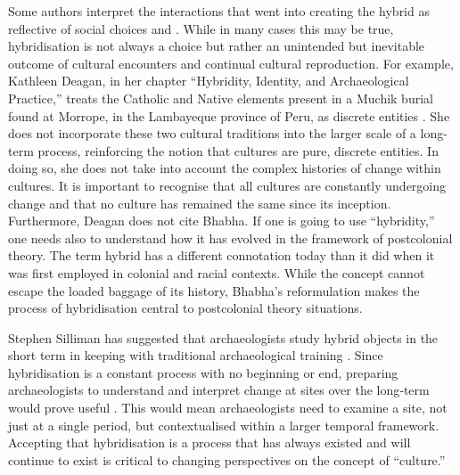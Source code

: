 	Some authors interpret the interactions that went into creating the hybrid as reflective of social choices \parencite {Deagan_2013} and \parencite {Silliman_2009}. While in many cases this may be true, hybridisation is not always a choice but rather an unintended but inevitable outcome of cultural encounters and continual cultural reproduction. For example, Kathleen Deagan, in her chapter “Hybridity, Identity, and Archaeological Practice,” treats the Catholic and Native elements present in a Muchik burial found at Morrope, in the Lambayeque province of Peru, as discrete entities \parencite[267] {Deagan_2013}. She does not incorporate these two cultural traditions into the larger scale of a long-term process, reinforcing the notion that cultures are pure, discrete entities. In doing so, she does not take into account the complex histories of change within cultures. It is important to recognise that all cultures are constantly undergoing change and that no culture has remained the same since its inception. Furthermore, Deagan does not cite Bhabha. If one is going to use “hybridity,” one needs also to understand how it has evolved in the framework of postcolonial theory. The term hybrid has a different connotation today than it did when it was first employed in colonial and racial contexts. While the concept cannot escape the loaded baggage of its history, Bhabha’s reformulation makes the process of hybridisation central to postcolonial theory situations. 

	Stephen Silliman has suggested that archaeologists study hybrid objects in the short term in keeping with traditional archaeological training \parencite {Silliman_2014}. Since hybridisation is a constant process with no beginning or end, preparing archaeologists to understand and interpret change at sites over the long‐term would prove useful \parencite {Lightfoot_1995}. This would mean archaeologists need to examine a site, not just at a single period, but contextualised within a larger temporal framework. Accepting that hybridisation is a process that has always existed and will continue to exist is critical to changing perspectives on the concept of “culture.” 

